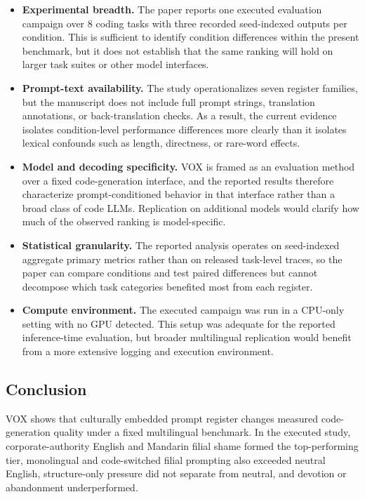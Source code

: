 \documentclass{article}
\begin{document}
\begin{itemize}
 \item \textbf{Experimental breadth.} The paper reports one executed evaluation campaign over 8 coding tasks with three recorded seed-indexed outputs per condition. This is sufficient to identify condition differences within the present benchmark, but it does not establish that the same ranking will hold on larger task suites or other model interfaces.
 \item \textbf{Prompt-text availability.} The study operationalizes seven register families, but the manuscript does not include full prompt strings, translation annotations, or back-translation checks. As a result, the current evidence isolates condition-level performance differences more clearly than it isolates lexical confounds such as length, directness, or rare-word effects.
 \item \textbf{Model and decoding specificity.} VOX is framed as an evaluation method over a fixed code-generation interface, and the reported results therefore characterize prompt-conditioned behavior in that interface rather than a broad class of code LLMs. Replication on additional models would clarify how much of the observed ranking is model-specific.
 \item \textbf{Statistical granularity.} The reported analysis operates on seed-indexed aggregate primary metrics rather than on released task-level traces, so the paper can compare conditions and test paired differences but cannot decompose which task categories benefited most from each register.
 \item \textbf{Compute environment.} The executed campaign was run in a CPU-only setting with no GPU detected. This setup was adequate for the reported inference-time evaluation, but broader multilingual replication would benefit from a more extensive logging and execution environment.
\end{itemize}

\subsection{Conclusion}

\label{sec:conclusion}

VOX shows that culturally embedded prompt register changes measured code-generation quality under a fixed multilingual benchmark. In the executed study, corporate-authority English and Mandarin filial shame formed the top-performing tier, monolingual and code-switched filial prompting also exceeded neutral English, structure-only pressure did not separate from neutral, and devotion or abandonment underperformed.
\end{document}
